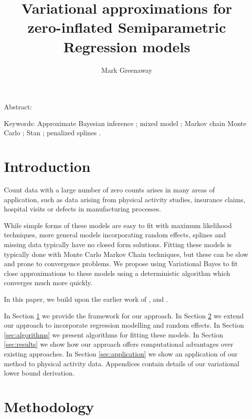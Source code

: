 \documentclass{article}[12pt]
\title{Variational approximations for zero-inflated Semiparametric Regression models}
\author{Mark Greenaway}
\begin{document}
\setlength{\parindent}{0pt}
\maketitle

Abstract:

Keywords: Approximate Bayesian inference ; mixed model ; Markov chain Monte Carlo ; Stan ; penalized splines .

\section{Introduction}
\label{sec:introduction}

Count data with a large number of zero counts arises in many areas of
application, such as data arising from physical activity studies, 
insurance claims, hospital visits or defects in manufacturing processes.

While simple forms of these models are easy to fit with maximum likelihood techniques,
more general models incorporating random effects, splines and missing data typically
have no closed form solutions. Fitting these models is typically done with Monte Carlo
Markov Chain techniques, but these can be slow and prone to convergence problems. We
propose using Variational Bayes to fit close approximations to these models
using a deterministic algorithm which converges much more quickly. \cite{BIOM:BIOM1030}
\cite{BIMJ:BIMJ200390024} \cite{JOFP:rethink} \cite{Min01042005} \cite{Shankar1997829}
\cite{Hall2000} \cite{LeeWangScottYauMcLachlan2006}


In this paper, we build upon the earlier work of \cite{lambert1992},
\cite{Ghosh20061360} and \cite{VatsaWilson2014}.

In Section \ref{sec:introduction} we provide the framework for our approach. In
Section \ref{sec:methodology} we extend our approach to incorporate regression modelling
and random effects. In Section \ref{sec:algorithms} we present algorithms for fitting these models.
In Section \ref{sec:results} we show how our approach offers computational advantages
over existing approaches. In Section \ref{sec:application} we show an application of our
method to physical activity data. Appendices contain details of our variational lower bound
derivation.

\section{Methodology}\label{sec:methodology}
\end{document}
